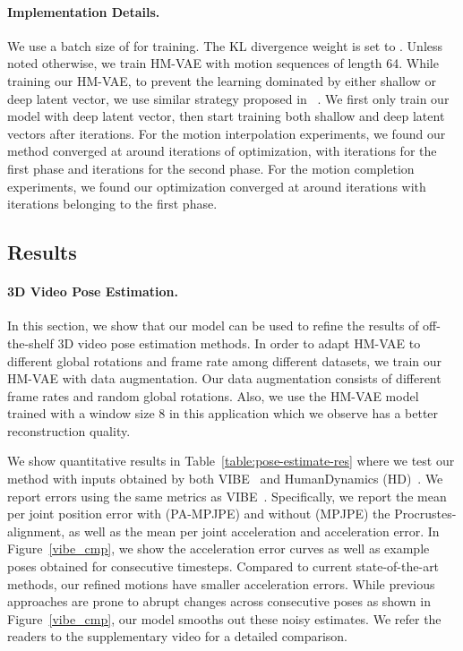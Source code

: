 \paragraph{Implementation Details.}
We use a batch size of  for training. The KL divergence weight  is set to . Unless noted otherwise, we train HM-VAE with motion sequences of length 64. While training our HM-VAE, to prevent the learning dominated by either shallow or deep latent vector, we use similar strategy proposed in ~\cite{li2020progressive}. We first only train our model with deep latent vector, then start training both shallow and deep latent vectors after  iterations. 
For the motion interpolation experiments, we found our method converged at around  iterations of optimization, with  iterations for the first phase and  iterations for the second phase.
For the motion completion experiments, we found our optimization converged at around  iterations with  iterations belonging to the first phase.





\subsection{Results}
\paragraph{3D Video Pose Estimation.}

In this section, we show that our model can be used to refine the results of off-the-shelf 3D video pose estimation methods. In order to adapt HM-VAE to different global rotations and frame rate among different datasets, we train our HM-VAE with data augmentation.
Our data augmentation consists of different frame rates and random global rotations.
Also, we use the HM-VAE model trained with a window size 8 in this application which we observe has a better reconstruction quality.


We show quantitative results in Table~\ref{table:pose-estimate-res} where we test our method with inputs obtained by both VIBE~\cite{kocabas2020vibe} and HumanDynamics (HD)~\cite{kanazawa2019learning}. We report errors using the same metrics as VIBE~\cite{kocabas2020vibe}. Specifically, we report the mean per joint position error with (PA-MPJPE) and without (MPJPE) the Procrustes-alignment, as well as the mean per joint acceleration and acceleration error. In Figure~\ref{vibe_cmp}, we show the acceleration error curves as well as example poses obtained for consecutive timesteps. Compared to current state-of-the-art methods, our refined motions have smaller acceleration errors. While previous approaches are prone to abrupt changes across consecutive poses as shown in Figure~\ref{vibe_cmp}, our model smooths out these noisy estimates. We refer the readers to the supplementary video for a detailed comparison.      


